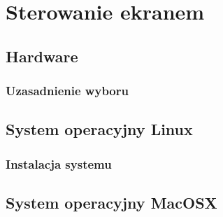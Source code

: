\section{Sterowanie ekranem}

\subsection{Hardware}

\subsubsection{Uzasadnienie wyboru}

\subsection{System operacyjny Linux}

\subsubsection{Instalacja systemu}

\subsection{System operacyjny MacOSX}
